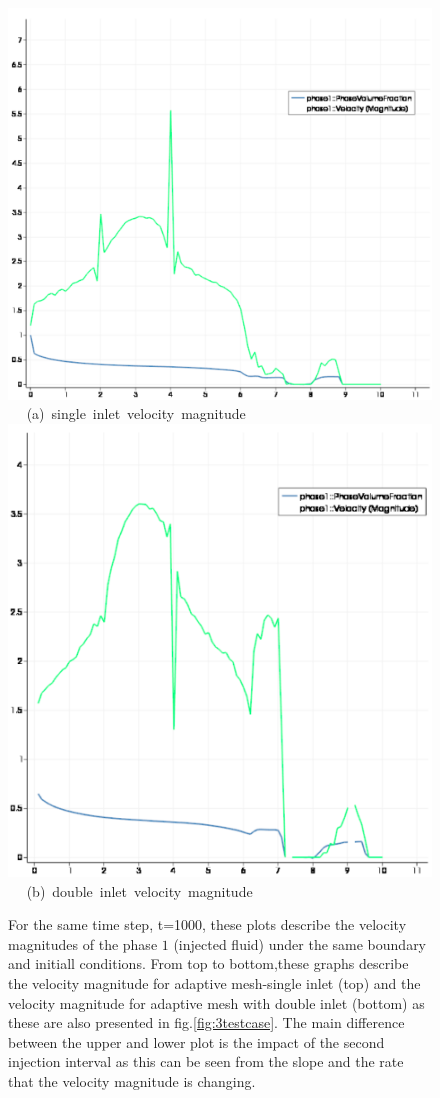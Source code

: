 \documentclass[preprint,authoryear,12pt]{elsarticle}
\begin{document}
\begin{figure}[h]
\vbox{
\hbox{\hspace{3.5cm}
\includegraphics[width=.5\textwidth]{./Pics1/mr10_5regions_adapt/5regions_adapt_vel_magn.pdf} 
}
\vspace{0.0cm}
\hbox{\hspace{5.0cm} (a) single inlet velocity magnitude   
}
\hbox{\hspace{3.5cm}
\includegraphics[width=.5\textwidth]{./Pics1/mr10_5regions_adapt_dinlet/5regions_dinlet_adapt_vel_magn.pdf}
}
\vspace{0.0cm}
\hbox{\hspace{5.0cm} (b) double inlet velocity magnitude   
}
}     
\caption{For the same time step, t=1000, these plots describe the velocity magnitudes of the phase $1$ (injected fluid) under the same boundary and initiall conditions. From top to bottom,these graphs describe the velocity magnitude %
for adaptive mesh-single inlet (top) and the velocity magnitude for adaptive mesh with double inlet (bottom) as these are also presented in fig.\ref{fig:3testcase}. The main difference between the upper and lower plot %
is the impact of the second injection interval as this can be seen from the slope and the rate that the velocity magnitude is changing.}
\label{fig:vel_magn}
\end{figure}
\end{document}
